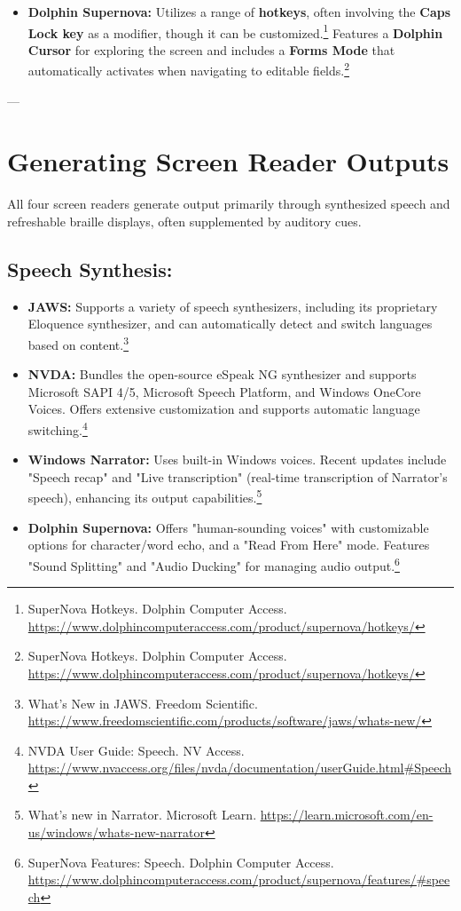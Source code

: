 \begin{itemize}[leftmargin=*,noitemsep,topsep=0pt]
    \item \textbf{Dolphin Supernova:} Utilizes a range of \textbf{hotkeys}, often involving the \textbf{Caps Lock key} as a modifier, though it can be customized.\footnote{SuperNova Hotkeys. Dolphin Computer Access. \url{https://www.dolphincomputeraccess.com/product/supernova/hotkeys/}} Features a \textbf{Dolphin Cursor} for exploring the screen and includes a \textbf{Forms Mode} that automatically activates when navigating to editable fields.\footnote{SuperNova Hotkeys. Dolphin Computer Access. \url{https://www.dolphincomputeraccess.com/product/supernova/hotkeys/}}
\end{itemize}

---

\section{Generating Screen Reader Outputs}

All four screen readers generate output primarily through synthesized speech and refreshable braille displays, often supplemented by auditory cues.

\subsection*{Speech Synthesis:}
\begin{itemize}[leftmargin=*,noitemsep,topsep=0pt]
    \item \textbf{JAWS:} Supports a variety of speech synthesizers, including its proprietary Eloquence synthesizer, and can automatically detect and switch languages based on content.\footnote{What's New in JAWS. Freedom Scientific. \url{https://www.freedomscientific.com/products/software/jaws/whats-new/}}
    \item \textbf{NVDA:} Bundles the open-source eSpeak NG synthesizer and supports Microsoft SAPI 4/5, Microsoft Speech Platform, and Windows OneCore Voices. Offers extensive customization and supports automatic language switching.\footnote{NVDA User Guide: Speech. NV Access. \url{https://www.nvaccess.org/files/nvda/documentation/userGuide.html#Speech}}
    \item \textbf{Windows Narrator:} Uses built-in Windows voices. Recent updates include "Speech recap" and "Live transcription" (real-time transcription of Narrator's speech), enhancing its output capabilities.\footnote{What's new in Narrator. Microsoft Learn. \url{https://learn.microsoft.com/en-us/windows/whats-new-narrator}}
    \item \textbf{Dolphin Supernova:} Offers "human-sounding voices" with customizable options for character/word echo, and a "Read From Here" mode. Features "Sound Splitting" and "Audio Ducking" for managing audio output.\footnote{SuperNova Features: Speech. Dolphin Computer Access. \url{https://www.dolphincomputeraccess.com/product/supernova/features/#speech}}
\end{itemize}

